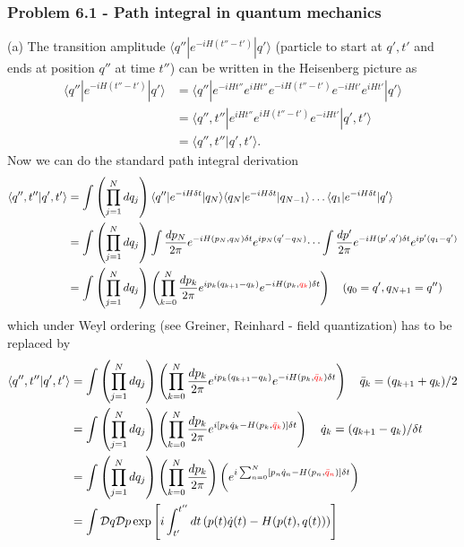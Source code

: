 \documentclass[10pt,a4paper]{article}
\theoremstyle{definition}
\begin{document}
\subsubsection{Problem 6.1 - Path integral in quantum mechanics}
(a) The transition amplitude $\langle q''|e^{-iH(t''-t')}|q'\rangle$ (particle to start at $q',t'$ and ends at position $q''$ at time $t''$) can be written in the Heisenberg picture as
\begin{align}
    \langle q''|e^{-iH(t''-t')}|q'\rangle
    &=\langle q''|e^{-iHt''}e^{iHt''}e^{-iH(t''-t')}e^{-iHt'}e^{iHt'}|q'\rangle\\
    &=\langle q'',t''|e^{iHt''}e^{iH(t''-t')}e^{-iHt'}|q',t'\rangle\\
    &=\langle q'',t''|q',t'\rangle.
\end{align}
Now we can do the standard path integral derivation
\begin{align}
    \langle q'',t''|q',t'\rangle
    &=\int\left(\prod_{j=1}^N dq_j\right) \langle q''|e^{-iH\delta t}|q_N\rangle \langle q_N|e^{-iH\delta t}|q_{N-1}\rangle \dots \langle q_1|e^{-iH\delta t}|q'\rangle\\
    &=\int\left(\prod_{j=1}^N dq_j\right) \int\frac{dp_N}{2\pi}e^{-iH(p_N,q_N)\delta t}e^{ip_N(q'-q_N)} \dots  \int\frac{dp'}{2\pi}e^{-iH(p',q')\delta t}e^{ip'(q_1-q')}\\
    &=\int\left(\prod_{j=1}^N dq_j\right)\left(\prod_{k=0}^{N}\frac{dp_k}{2\pi} e^{ip_k(q_{k+1}-q_k)}e^{-iH(p_k,\textcolor{red}{q_k})\delta t}\right)\quad(q_0=q',q_{N+1}=q'')
\end{align}
which under Weyl ordering (see Greiner, Reinhard - field quantization) has to be replaced by
\begin{align}
    \langle q'',t''|q',t'\rangle
    &=\int\left(\prod_{j=1}^N dq_j\right)\left(\prod_{k=0}^{N}\frac{dp_k}{2\pi} e^{ip_k(q_{k+1}-q_k)}e^{-iH(p_k,\textcolor{red}{\bar{q}_k})\delta t}\right)\quad \bar{q}_k=(q_{k+1}+q_k)/2\\
    &=\int\left(\prod_{j=1}^N dq_j\right)\left(\prod_{k=0}^{N}\frac{dp_k}{2\pi} e^{i[p_k\dot{q}_k-H(p_k,\textcolor{red}{\bar{q}_k})]\delta t}\right)\quad \dot{q}_k=(q_{k+1}-q_k)/{\delta t}\\
    &=\int\left(\prod_{j=1}^N dq_j\right)\left(\prod_{k=0}^{N}\frac{dp_k}{2\pi}\right) \left(e^{i\sum_{n=0}^N[p_n\dot{q}_n-H(p_n,\textcolor{red}{\bar{q}_n})]\delta t}\right)\\
    &=\int\mathcal{D}q\mathcal{D}p\exp\left[i\int_{t'}^{t''}dt\left(p(t)\dot{q}(t)-H(p(t),q(t))\right)\right]
\end{align}
\end{document}
